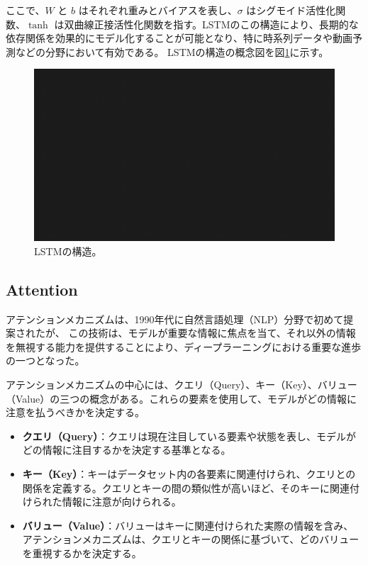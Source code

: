     ここで、\( W \) と \( b \) はそれぞれ重みとバイアスを表し、\( \sigma \) はシグモイド活性化関数、\( \tanh \) は双曲線正接活性化関数を指す。LSTMのこの構造により、長期的な依存関係を効果的にモデル化することが可能となり、特に時系列データや動画予測などの分野において有効である。
    LSTMの構造の概念図を図\ref{fig:lstm}に示す。
    \begin{figure}[h]
      \centering
      \includegraphics[width=\textwidth]{figures/sample.png}
      \caption{LSTMの構造。}
      \label{fig:lstm}
    \end{figure}
    
    \subsection{Attention}
    アテンションメカニズムは、1990年代に自然言語処理（NLP）分野で初めて提案されたが、
    この技術は、モデルが重要な情報に焦点を当て、それ以外の情報を無視する能力を提供することにより、ディープラーニングにおける重要な進歩の一つとなった。

    アテンションメカニズムの中心には、クエリ（Query）、キー（Key）、バリュー（Value）の三つの概念がある。これらの要素を使用して、モデルがどの情報に注意を払うべきかを決定する。
    \begin{itemize}
      \item \textbf{クエリ（Query）}：クエリは現在注目している要素や状態を表し、モデルがどの情報に注目するかを決定する基準となる。
      \item \textbf{キー（Key）}：キーはデータセット内の各要素に関連付けられ、クエリとの関係を定義する。クエリとキーの間の類似性が高いほど、そのキーに関連付けられた情報に注意が向けられる。
      \item \textbf{バリュー（Value）}：バリューはキーに関連付けられた実際の情報を含み、アテンションメカニズムは、クエリとキーの関係に基づいて、どのバリューを重視するかを決定する。
    \end{itemize}

